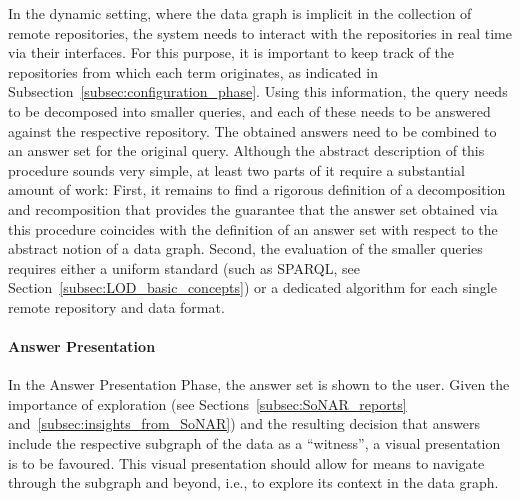 In the dynamic setting, where the data graph is implicit in the collection of remote repositories,
the system needs to interact with the repositories in real time via their interfaces.
For this purpose, it is important to keep track of the repositories
from which each term originates, as indicated in Subsection~\ref{subsec:configuration_phase}.
Using this information, the query needs to be decomposed into
smaller queries, and each of these needs to be answered against the respective repository.
The obtained answers need to be combined to an answer set for the original query.
Although the abstract description of this procedure sounds very simple,
at least two parts of it require a substantial amount of work:
First, it remains to find a rigorous definition of a decomposition and recomposition
that provides the guarantee that the answer set obtained via this procedure 
coincides with the definition of an answer set with respect to the abstract notion
of a data graph.
Second, the evaluation of the smaller queries
requires either a uniform standard (such as \gls{SPARQL}, see Section~\ref{subsec:LOD_basic_concepts})
or a dedicated algorithm for each single remote repository and data format.
%
%

\paragraph{Answer Presentation}

In the Answer Presentation Phase, the answer set is shown to the user.
Given the importance of exploration (see Sections~\ref{subsec:SoNAR_reports} and~\ref{subsec:insights_from_SoNAR})
and the resulting decision that answers include the respective subgraph of the data as a \enquote{witness},
a visual presentation is to be favoured. This visual presentation should allow for means to navigate through the subgraph
and beyond, i.e., to explore its context in the data graph.

